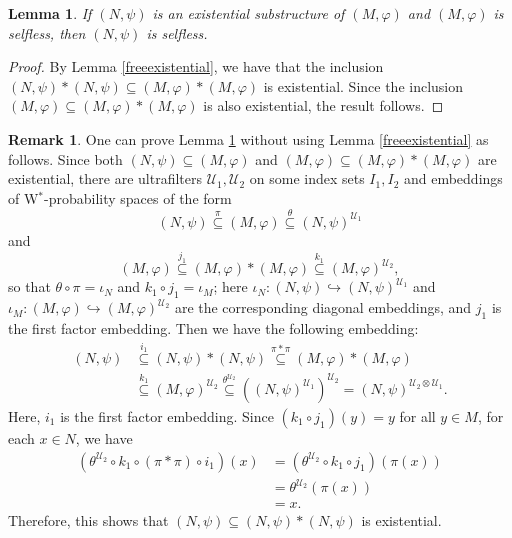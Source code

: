 \documentclass[12pt]{amsart}
\newtheorem{lem}[thm]{Lemma}
\theoremstyle{definition}
\newtheorem{remark}[thm]{Remark}
\def\cal{\mathcal}
\def\u{\mathsf 1}
\newcommand\cU{{\cal U}}
\def \u{\mathcal U}
\begin{document}
\begin{lem}\label{selflessexistential}
If $(N,\psi)$ is an existential substructure of $(M,\varphi)$ and $(M,\varphi)$ is selfless, then $(N,\psi)$ is selfless.
\end{lem}

\begin{proof}
By Lemma \ref{freeexistential}, we have that the inclusion $(N,\psi)*(N,\psi)\subseteq (M,\varphi)*(M,\varphi)$ is existential.  Since the inclusion $(M,\varphi)\subseteq (M,\varphi)*(M,\varphi)$ is also existential, the result follows.  
\end{proof}

\begin{remark}
One can prove Lemma \ref{selflessexistential} without using Lemma \ref{freeexistential} as follows.
Since both $(N,\psi)\subseteq (M,\varphi)$ and 
$(M,\varphi)\subseteq (M,\varphi)*(M,\varphi)$ are existential, there are ultrafilters $\cU_1,\cU_2$ on some index sets $I_1, I_2$ and embeddings of W$^*$-probability spaces of the form
\[(N,\psi)\stackrel{\pi}{\subseteq}(M,\varphi)\stackrel{\theta}{\subseteq}(N,\psi)^{\cU_1}\]
and 
\[(M,\varphi)\stackrel{j_1}{\subseteq}(M,\varphi)*(M,\varphi)\stackrel{k_1}{\subseteq}(M,\varphi)^{\cU_2},\]
so that $\theta\circ \pi=\iota_N$ and $k_1\circ j_1=\iota_M$; here $\iota_N\colon (N,\psi)\hookrightarrow (N,\psi)^{\cU_1}$ and $\iota_M\colon (M,\varphi)\hookrightarrow (M,\varphi)^{\cU_2}$ are the corresponding diagonal embeddings, and $j_1$ is the first factor embedding. 
Then we have the following embedding: 
\begin{align*}
    (N,\psi)&\stackrel{i_1}{\subseteq}(N,\psi)*(N,\psi)\stackrel{\pi*\pi}{\subseteq}(M,\varphi)*(M,\varphi)\\
    &\stackrel{k_1}{\subseteq}(M,\varphi)^{\cU_2}
    \stackrel{\theta^{\cU_2}}{\subseteq}((N,\psi)^{\cU_1})^{\cU_2}=(N,\psi)^{\cU_2\otimes \cU_1}.
\end{align*}
Here, $i_1$ is the first factor embedding. Since $(k_1\circ j_1)(y)=y$ for all $y\in M$, for each $x\in N$, we have 
\begin{align*}
    (\theta^{\u_2}\circ k_1\circ (\pi*\pi)\circ i_1)(x)&=(\theta^{\u_2}\circ k_1\circ j_1)(\pi(x))\\ &=\theta^{\u_2}(\pi(x))\\
    &=x. 
\end{align*}
Therefore, this shows that $(N,\psi)\subseteq (N,\psi)*(N,\psi)$ is existential.
\end{remark}
\end{document}
